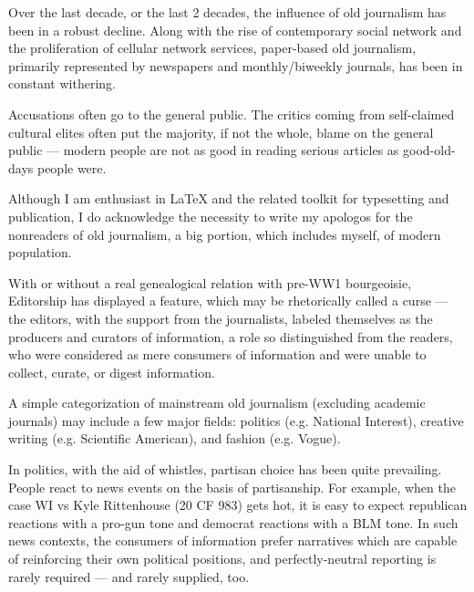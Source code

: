 
\begin{multicols*}{2}

	Over the last decade, or the last 2 decades, the influence of old journalism has been in a robust decline.
	Along with the rise of contemporary social network and the proliferation of cellular network services,
	paper-based old journalism, primarily represented by newspapers and monthly/biweekly journals,
	has been in constant withering.

	Accusations often go to the general public.
	The critics coming from self-claimed cultural elites often put the majority, if not the whole, blame on the general public ---
	modern people are not as good in reading serious articles as good-old-days people were.

    Although I am enthusiast in \LaTeX{} and the related toolkit for typesetting and publication,
    I do acknowledge the necessity to write my apologos for the nonreaders of old journalism,
    a big portion, which includes myself, of modern population.


    With or without a real genealogical relation with pre-WW1 bourgeoisie,
    Editorship has displayed a feature, which may be rhetorically called a curse ---
    the editors, with the support from the journalists,
    labeled themselves as the producers and curators of information,
    a role so distinguished from the readers,
    who were considered as mere consumers of information and were unable to collect, curate, or digest information.

    A simple categorization of mainstream old journalism (excluding academic journals) may include a few major fields:
    politics (e.g. National Interest),
    creative writing (e.g. Scientific American),
    and fashion (e.g. Vogue).

    In politics, with the aid of whistles, partisan choice has been quite prevailing.
    People react to news events on the basis of partisanship.
    For example, when the case WI vs Kyle Rittenhouse (20 CF 983) gets hot,
    it is easy to expect republican reactions with a pro-gun tone and democrat reactions with a BLM tone.
    In such news contexts, the consumers of information prefer narratives
    which are capable of reinforcing their own political positions,
    and perfectly-neutral reporting is rarely required --- and rarely supplied, too.


\end{multicols*}
